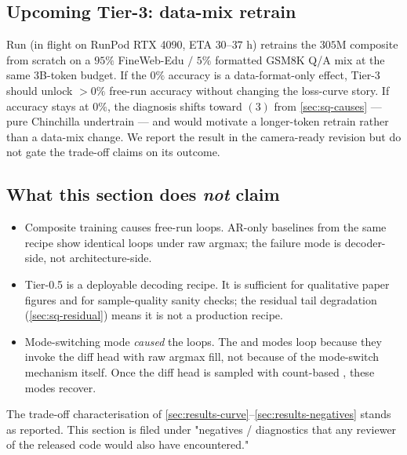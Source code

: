 \subsection{Upcoming Tier-3: data-mix retrain}
\label{sec:sq-tier3}

Run  (in flight on RunPod RTX 4090, ETA $30$--$37$ h)
retrains the $305$M composite from scratch on a $95\%$ FineWeb-Edu
$/$ $5\%$ formatted GSM8K Q/A mix at the same $3$B-token budget. If
the $0\%$ accuracy is a data-format-only effect, Tier-3 should
unlock $>0\%$ free-run accuracy without changing the loss-curve
story. If accuracy stays at $0\%$, the diagnosis shifts toward
$(3)$ from \textsection\ref{sec:sq-causes} --- pure Chinchilla
undertrain --- and would motivate a longer-token retrain rather than
a data-mix change. We report the  result in the camera-ready
revision but do not gate the trade-off claims on its outcome.

\subsection{What this section does \emph{not} claim}

\begin{itemize}
  \item Composite training causes free-run loops. AR-only baselines
        from the same recipe show identical loops under raw argmax;
        the failure mode is decoder-side, not architecture-side.
  \item Tier-0.5 is a deployable decoding recipe. It is sufficient
        for qualitative paper figures and for sample-quality sanity
        checks; the residual tail degradation
        (\textsection\ref{sec:sq-residual}) means it is not a
        production recipe.
  \item Mode-switching mode \emph{caused} the loops. The
         and  modes loop
        because they invoke the diff head with raw argmax fill, not
        because of the mode-switch mechanism itself. Once the diff
        head is sampled with count-based , these
        modes recover.
\end{itemize}

The trade-off characterisation of
\textsection\ref{sec:results-curve}--\ref{sec:results-negatives}
stands as reported. This section is filed under "negatives /
diagnostics that any reviewer of the released code would also have
encountered."
